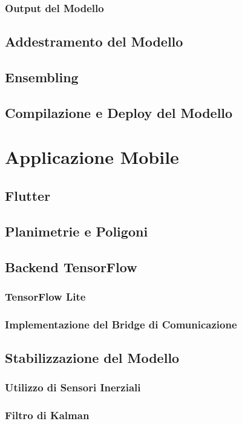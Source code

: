 \documentclass[12pt]{report}
\begin{document}
\subsection{Output del Modello}
\section{Addestramento del Modello}
\section{Ensembling}
\section{Compilazione e Deploy del Modello}

\chapter{Applicazione Mobile}
\section{Flutter}
\section{Planimetrie e Poligoni}
\section{Backend TensorFlow}
\subsection{TensorFlow Lite}
\subsection{Implementazione del Bridge di Comunicazione}
\section{Stabilizzazione del Modello}
\subsection{Utilizzo di Sensori Inerziali}
\subsection{Filtro di Kalman}
\end{document}
